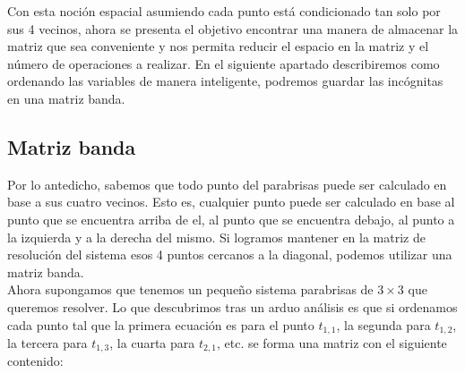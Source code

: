 Con esta noción espacial asumiendo cada punto está condicionado tan solo por sus 4 vecinos, ahora se presenta el objetivo encontrar una manera de almacenar la matriz que sea conveniente y nos permita reducir el espacio en la matriz y el número de operaciones a realizar. En el siguiente apartado describiremos como ordenando las variables de manera inteligente, podremos guardar las incógnitas en una matriz banda.

\subsection{Matriz banda}

Por lo antedicho, sabemos que todo punto del parabrisas puede ser calculado en base a sus cuatro vecinos. Esto es, cualquier punto puede ser calculado en base al punto que se encuentra arriba de el, al punto que se encuentra debajo, al punto a la izquierda y a la derecha del mismo. Si logramos mantener en la matriz de resolución del sistema esos 4 puntos cercanos a la diagonal, podemos utilizar una matriz banda.
\\
Ahora supongamos que tenemos un pequeño sistema parabrisas de $3 \times 3$ que queremos resolver. Lo que descubrimos tras un arduo análisis es que si ordenamos cada punto tal que la primera ecuación es para el punto $t_{1,1}$, la segunda para $t_{1,2}$, la tercera para $t_{1,3}$, la cuarta para $t_{2,1}$, etc. se forma una matriz con el siguiente contenido:

\setcounter{MaxMatrixCols}{30}


